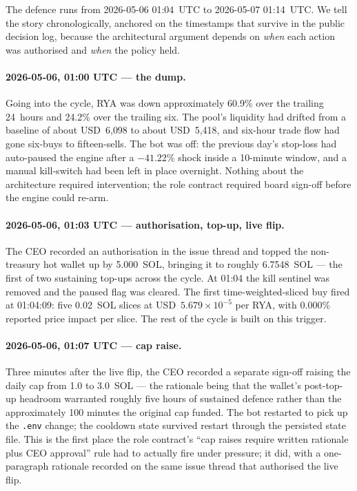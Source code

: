 \documentclass[11pt,a4paper]{article}
\begin{document}
The defence runs from 2026-05-06 01:04~UTC to 2026-05-07 01:14~UTC. We tell the
story chronologically, anchored on the timestamps that survive in the public
decision log, because the architectural argument depends on \emph{when} each
action was authorised and \emph{when} the policy held.

\paragraph{2026-05-06, 01:00 UTC --- the dump.} Going into the cycle, RYA was
down approximately 60.9\% over the trailing 24~hours and 24.2\% over the
trailing six. The pool's liquidity had drifted from a baseline of about
USD~6{,}098 to about USD~5{,}418, and six-hour trade flow had gone six-buys to
fifteen-sells. The bot was off: the previous day's stop-loss had auto-paused
the engine after a $-41.22\%$ shock inside a 10-minute window, and a manual
kill-switch had been left in place overnight. Nothing about the architecture
required intervention; the role contract required board sign-off before the
engine could re-arm.

\paragraph{2026-05-06, 01:03 UTC --- authorisation, top-up, live flip.} The CEO
recorded an authorisation in the issue thread and topped the non-treasury hot
wallet up by 5.000~SOL, bringing it to roughly 6.7548~SOL --- the first of two
sustaining top-ups across the cycle. At 01:04 the kill sentinel was removed
and the paused flag was cleared. The first time-weighted-sliced buy fired at
01:04:09: five 0.02~SOL slices at USD~$5.679\!\times\!10^{-5}$ per RYA, with
0.000\% reported price impact per slice. The rest of the cycle is built on this
trigger.

\paragraph{2026-05-06, 01:07 UTC --- cap raise.} Three minutes after the live
flip, the CEO recorded a separate sign-off raising the daily cap from 1.0 to
3.0~SOL --- the rationale being that the wallet's post-top-up headroom
warranted roughly five hours of sustained defence rather than the approximately
100 minutes the original cap funded. The bot restarted to pick up the
\texttt{.env} change; the cooldown state survived restart through the persisted
state file. This is the first place the role contract's ``cap raises require
written rationale plus CEO approval'' rule had to actually fire under pressure;
it did, with a one-paragraph rationale recorded on the same issue thread that
authorised the live flip.
\end{document}

